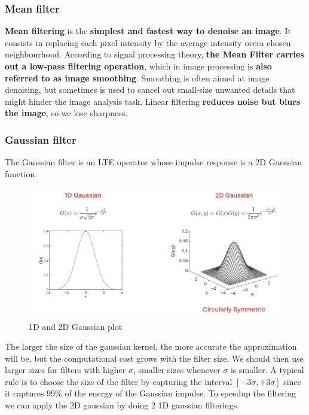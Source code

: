 \subsubsection{Mean filter}

\textbf{Mean filtering} is the \textbf{simplest and fastest way to denoise an image}.
It consists in replacing each pixel intensity by the average intensity overa chosen neighbourhood.
According to signal processing theory, \textbf{the Mean Filter carries out a low-pass filtering operation}, which in image processing is \textbf{also referred to as image smoothing}.
Smoothing is often aimed at image denoising, but sometimes is used to cancel out small-size unwanted details that might hinder the image analysis task.
Linear filtering \textbf{reduces noise but blurs the image}, so we lose sharpness.

\subsubsection{Gaussian filter}

The Gaussian filter is an LTE operator whose impulse response is a 2D Gaussian function.

\begin{figure}[htbp]
  \centering
  \includegraphics[width=0.7\linewidth]{./img/gaussian_filter.jpg}
  \caption{1D and 2D Gaussian plot}
  \label{fig:gaussian_filter}
\end{figure}

The larger the size of the gaussian kernel, the more accurate the approximation will be, but the computational cost grows with the filter size.
We should then use larger sizes for filters with higher $\sigma$, smaller sizes whenever $\sigma$ is smaller.
A typical rule is to choose the size of the filter by capturing the interval $[-3\sigma, +3\sigma]$ since it captures 99\% of the energy of the Gaussian impulse.
To speedup the filtering we can apply the 2D gaussian by doing 2 1D gaussian filterings.

